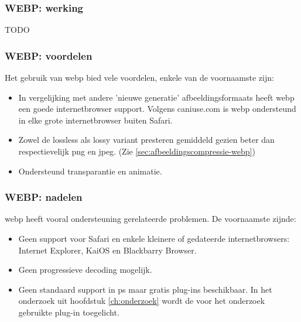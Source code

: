 \subsubsection{WEBP: werking}
\label{sec:afbeeldingscompressie-webp-werking}

TODO


\subsubsection{WEBP: voordelen}
\label{sec:afbeeldingscompressie-webp-voordelen}

Het gebruik van \gls{webp} bied vele voordelen, enkele van de voornaamste zijn:

\begin{itemize}
	\item In vergelijking met andere 'nieuwe generatie' \glspl{afbeeldingsformaat} heeft \gls{webp} een goede internetbrowser support. Volgens caniuse.com is \gls{webp} ondersteund in elke grote internetbrowser buiten Safari.
	
	\item Zowel de \gls{lossless} als \gls{lossy} variant presteren gemiddeld gezien beter dan respectievelijk \gls{png} en \gls{jpeg}. (Zie \ref{sec:afbeeldingscompressie-webp})
	
	\item Ondersteund transparantie en animatie.
\end{itemize}

\subsubsection{WEBP: nadelen}
\label{sec:afbeeldingscompressie-webp-nadelen}

\Gls{webp} heeft vooral ondersteuning gerelateerde problemen. De voornaamste zijnde:

\begin{itemize}
	\item Geen support voor Safari en enkele kleinere of gedateerde internetbrowsers: Internet Explorer, KaiOS en Blackbarry Browser.
	
	\item Geen progressieve \gls{decoding} mogelijk.
	
	\item Geen standaard support in \gls{ps} maar gratis \glspl{plug-in} beschikbaar. In het onderzoek uit hoofdstuk \ref{ch:onderzoek} wordt de voor het onderzoek gebruikte \gls{plug-in} toegelicht.
\end{itemize}

